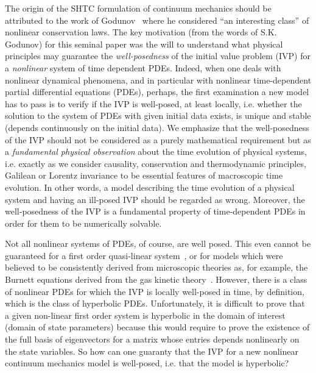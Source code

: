 \documentclass[twoside]{article}
\newcommand{\qq}{{\boldsymbol{q}}}
\newcommand{\FF}{{\boldsymbol{F}}}
\newcommand{\pd}{\partial}
\newcommand{\IP}[1]{ \textcolor{blue}   {\small\texttt{
\texttt{[image: pin\_small.jpeg]} Ilya: #1}} }
\newcommand{\MP}[1]{ \textcolor{Green}   {\small\texttt{
\texttt{[image: pin\_small.jpeg]} Michal: #1}} }
\begin{document}
The origin of the SHTC formulation of continuum mechanics should be attributed 
to the work of 
Godunov~\cite{God1961} where he considered ``an interesting class'' of 
nonlinear conservation laws. The key motivation (from the words 
of S.K. Godunov) for this seminal paper was the will to understand what 
physical principles may guarantee the \textit{ well-posedness} of the initial 
value problem (IVP) for a \textit{nonlinear} system of time dependent PDEs. 
Indeed, when one deals with nonlinear dynamical phenomena, and in particular with 
nonlinear 
time-dependent partial
differential equations (PDEs), perhaps, the first examination a new model has 
to pass is to verify if the IVP is well-posed, at least locally, i.e. whether 
the solution to the system of PDEs with given initial data exists, is unique 
and stable (depends continuously on  the initial data). We emphasize
that the well-posedness of the IVP should not be considered as a purely 
mathematical requirement but as a
\textit{fundamental physical observation} about the time evolution of physical 
systems, 
i.e. exactly as we consider
causality, conservation and thermodynamic principles, Galilean or Lorentz 
invariance to be essential features of macroscopic time evolution. In other 
words, a model describing the 
time evolution of a physical
system and having an ill-posed IVP should be regarded as wrong. Moreover, the 
well-posedness of the IVP
is a fundamental property of time-dependent PDEs in order for them to be numerically 
solvable.

Not all nonlinear systems of PDEs, of course, are well posed. 
This even cannot be guaranteed for a first order 
quasi-linear system~\cite{Serre2007,DupretMarchal1986,MullerRuggeri1998},
or for models which were believed to be consistently derived from microscopic 
theories as, for 
example, the Burnett
equations derived from the gas kinetic 
theory~\cite{Bobylev1982,StruchtrupTorrilhonR13,Torrilhon2016a}. However, there 
is a class of nonlinear PDEs for which the IVP is locally well-posed in time, 
by definition, which is the class of 
hyperbolic PDEs. Unfortunately,
it is difficult to prove that a given non-linear first order system is 
hyperbolic in the domain of interest (domain of state parameters) because this 
would 
require to prove the
existence of the full basis of eigenvectors for a matrix whose entries depends
nonlinearly on the state variables.
So how can one guaranty that the IVP for a new nonlinear 
continuum mechanics model is well-posed, i.e. 
that the model is hyperbolic? 
\end{document}
